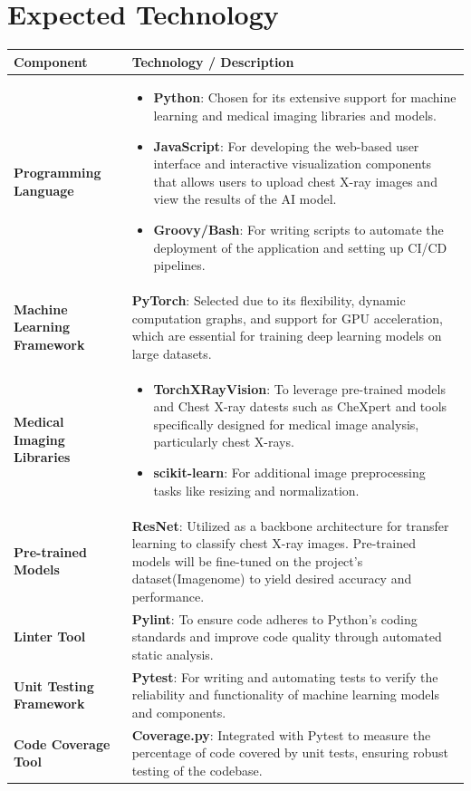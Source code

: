 \documentclass{article}
\begin{document}
\newpage
\section{Expected Technology}
\renewcommand{\arraystretch}{1.5} 
\begin{table}[h!]
    \centering
    \begin{tabularx}{\textwidth}{| >{\raggedright\arraybackslash}m{3.5cm} | >{\raggedright\arraybackslash}X |}
        \hline
        \textbf{Component} & \textbf{Technology / Description} \\ \hline
        \textbf{Programming Language} & \begin{itemize}
          \item \textbf{Python}: Chosen for its extensive support for machine learning and medical imaging libraries and models.
          \item \textbf{JavaScript}: For developing the web-based user interface and interactive visualization components that allows users to upload chest X-ray images and view the results of the AI model.
          \item \textbf{Groovy/Bash}: For writing scripts to automate the deployment of the application and setting up CI/CD pipelines.
      \end{itemize} \\ \hline 
        \textbf{Machine Learning Framework} & \textbf{PyTorch}: Selected due to its flexibility, dynamic computation graphs, and support for GPU acceleration, which are essential for training deep learning models on large datasets. \\ \hline
        \textbf{Medical Imaging Libraries} & \begin{itemize}
            \item \textbf{TorchXRayVision}: To leverage pre-trained models and Chest X-ray datests such as CheXpert and tools specifically designed for medical image analysis, particularly chest X-rays. 
            \item \textbf{scikit-learn}: For additional image preprocessing tasks like resizing and normalization.
        \end{itemize} \\ \hline
        \textbf{Pre-trained Models} & \textbf{ResNet}: Utilized as a backbone architecture for transfer learning to classify chest X-ray images. Pre-trained models will be fine-tuned on the project’s dataset(Imagenome) to yield desired accuracy and performance. \\ \hline
        \textbf{Linter Tool} & \textbf{Pylint}: To ensure code adheres to Python's coding standards and improve code quality through automated static analysis. \\ \hline
        \textbf{Unit Testing Framework} & \textbf{Pytest}: For writing and automating tests to verify the reliability and functionality of machine learning models and components. \\ \hline
        \textbf{Code Coverage Tool} & \textbf{Coverage.py}: Integrated with Pytest to measure the percentage of code covered by unit tests, ensuring robust testing of the codebase. \\ \hline
        

\end{tabularx}
\end{table}
\end{document}

